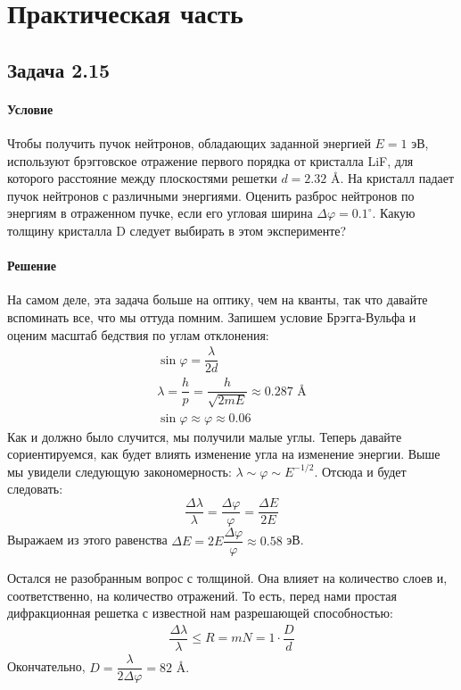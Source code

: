 \documentclass[12pt]{article}
\begin{document}
\section{Практическая часть}

\subsection{Задача 2.15}
\label{task_2.15}
\paragraph{Условие}
Чтобы получить пучок нейтронов, обладающих заданной энергией $E = 1$ эВ, используют брэгговское отражение первого порядка от кристалла LiF, для которого расстояние между плоскостями решетки $d = 2.32$ \AA . На кристалл падает пучок нейтронов с различными энергиями. Оценить разброс нейтронов по энергиям в отраженном пучке, если его угловая ширина $\Delta \varphi = 0.1^{\circ}$. Какую толщину кристалла D следует выбирать в этом эксперименте?
\paragraph{Решение}
На самом деле, эта задача больше на оптику, чем на кванты, так что давайте вспоминать все, что мы оттуда помним. Запишем условие Брэгга-Вульфа и оценим масштаб бедствия по углам отклонения:
\begin{gather*}
    \sin{\varphi} = \dfrac{\lambda}{2d}\\
    \lambda = \dfrac{h}{p} = \dfrac{h}{\sqrt{2mE}} \approx 0.287 \text{ \AA} \\
    \sin{\varphi} \approx \varphi \approx 0.06
\end{gather*}
Как и должно было случится, мы получили малые углы. Теперь давайте сориентируемся, как будет влиять изменение угла на изменение энергии. Выше мы увидели следующую закономерность: $\lambda \sim \varphi  \sim E^{-1/2} $. Отсюда и будет следовать:
\begin{equation*}
    \dfrac{\Delta \lambda}{\lambda} = \dfrac{\Delta \varphi}{\varphi} = \dfrac{\Delta E}{2E}
\end{equation*}
Выражаем из этого равенства $\Delta E = 2E \dfrac{\Delta \varphi}{\varphi} \approx 0.58$ эВ.

Остался не разобранным вопрос с толщиной. Она влияет на количество слоев и, соответственно, на количество отражений. То есть, перед нами простая дифракционная решетка с известной нам разрешающей способностью:
\begin{gather*}
    \dfrac{\Delta \lambda}{\lambda} \le R = mN = 1\cdot \dfrac{D}{d}
\end{gather*}
Окончательно, $D = \dfrac{\lambda}{2\Delta \varphi} = 82 \text{ \AA}.$
\end{document}
